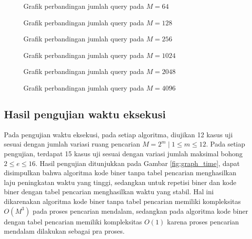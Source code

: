 \begin{figure}
\centering
{}
\caption{Grafik perbandingan jumlah query pada $M=64$}
\label{fig:graph_query6}
\end{figure}

\begin{figure}
\centering
{}
\caption{Grafik perbandingan jumlah query pada $M=128$}
\label{fig:graph_query7}
\end{figure}

\begin{figure}
\centering
{}
\caption{Grafik perbandingan jumlah query pada $M=256$}
\label{fig:graph_query8}
\end{figure}


\begin{figure}
\centering
{}
\caption{Grafik perbandingan jumlah query pada $M=1024$}
\label{fig:graph_query10}
\end{figure}

\begin{figure}
\centering
{}
\caption{Grafik perbandingan jumlah query pada $M=2048$}
\label{fig:graph_query11}
\end{figure}

\begin{figure}
\centering
{}
\caption{Grafik perbandingan jumlah query pada $M=4096$}
\label{fig:graph_query12}
\end{figure}

\subsection{Hasil pengujian waktu eksekusi}

Pada pengujian waktu eksekusi, pada setiap algoritma, diujikan 12 kasus uji sesuai dengan jumlah variasi ruang pencarian $M = 2^m \mid 1 \leq m \leq 12$. Pada setiap pengujian, terdapat 15 kasus uji sesuai dengan variasi jumlah maksimal bohong $2 \leq e \leq 16$. Hasil pengujian ditunjukkan pada Gambar \ref{fig:graph_time}, dapat disimpulkan bahwa algoritma kode biner tanpa tabel pencarian menghasilkan laju peningkatan waktu yang tinggi, sedangkan untuk repetisi biner dan kode biner dengan tabel pencarian menghasilkan waktu yang stabil. Hal ini dikarenakan algoritma kode biner tanpa tabel pencarian memiliki kompleksitas $O(M^3)$ pada proses pencarian mendalam, sedangkan pada algoritma kode biner dengan tabel pencarian memiliki kompleksitas $O(1)$ karena proses pencarian mendalam dilakukan sebagai pra proses.

